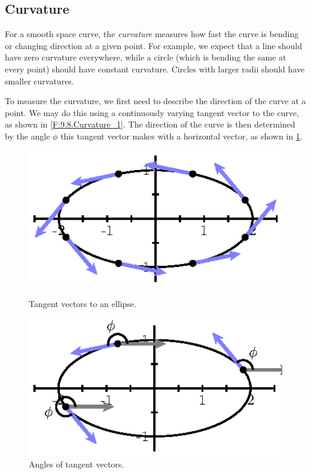 \subsection*{Curvature}

For a smooth space curve, the \emph{curvature} measures how fast the
curve is bending or changing direction at a given point. For example,
we expect that a line should have zero curvature everywhere, while a
circle (which is bending the same at every point) should have constant
curvature.  Circles with larger radii should have smaller curvatures.

To measure the curvature, we first need to describe the direction of
the curve at a point.  We may do this using a continuously varying
tangent vector to the curve, as shown in \ref{F:9.8.Curvature_1}.  
The direction of the curve is then determined by the angle $\phi$ this
tangent vector makes with a horizontal vector, as shown in
\ref{F:9.8.Curvature_angles}.  

\begin{figure}[ht]
\begin{center}
\begin{minipage}{3in}
\begin{center}
\includegraphics{figures/fig_9_8_tangents.eps}
\end{center}
\caption{Tangent vectors to an ellipse.}
\label{F:9.8.Curvature_1}
\end{minipage} %
\begin{minipage}{3in}
\begin{center}
\includegraphics{figures/fig_9_8_tangents_angles.eps}
\end{center}
\caption{Angles of tangent vectors.}
\label{F:9.8.Curvature_angles}
\end{minipage}
\end{center}
\end{figure}


